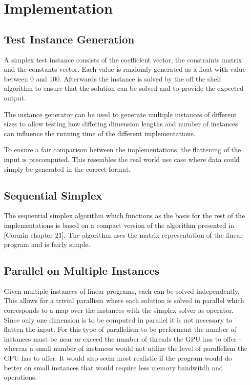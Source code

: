 \section{Implementation}
\subsection{Test Instance Generation}
A simplex test instance consists of the coefficient vector, the constraints matrix and the constants vector. Each value is randomly generated as a float with value between 0 and 100. Afterwards the instance is solved by the off the shelf algorithm to ensure that the solution can be solved and to provide the expected output. 

The instance generator can be used to generate multiple instances of different sizes to allow testing how differing dimension lengths and number of instances can influence the running time of the different implementations.

To ensure a fair comparison between the implementations, the flattening of the input is precomputed. This resembles the real world use case where data could simply be generated in the correct format.

\subsection{Sequential Simplex}
The sequential simplex algorithm which functions as the basis for the rest of the implementations is based on a compact version of the algorithm presented in [Cormin chapter 21]. The algorithm uses the matrix representation of the linear program and is fairly simple.  

\subsection{Parallel on Multiple Instances}
Given multiple instances of linear programs, each can be solved independently. This allows for a trivial parallism where each solution is solved in parallel which corresponds to a map over the instances with the simplex solver as operator. Since only one dimension is to be computed in parallel it is not necessary to flatten the input. For this type of parallelism to be performant the number of instances must be near or exceed the number of threads the GPU has to offer - whereas a small number of instances would not utilize the level of parallelism the GPU has to offer. It would also seem most realistic if the program would do better on small instances that would require less memory bandwitdh and operations.

